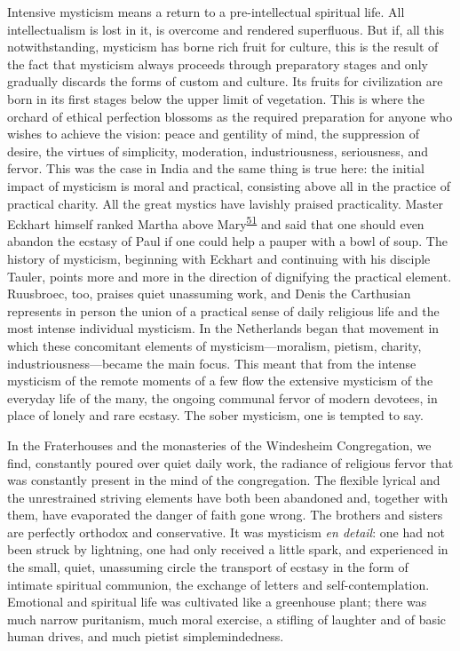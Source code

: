Intensive mysticism means a return to a pre-intellectual spiritual life.
All intellectualism is lost in it, is overcome and rendered superfluous.
But if, all this notwithstanding, mysticism has borne rich fruit for
culture, this is the result of the fact that mysticism always
\protect\hypertarget{17_Chapter_Ten__THE_FAILURE_OF_IMAG.xhtmlux5cux23page_265}{}{}proceeds
through preparatory stages and only gradually discards the forms of
custom and culture. Its fruits for civilization are born in its first
stages below the upper limit of vegetation. This is where the orchard of
ethical perfection blossoms as the required preparation for anyone who
wishes to achieve the vision: peace and gentility of mind, the
suppression of desire, the virtues of simplicity, moderation,
industriousness, seriousness, and fervor. This was the case in India and
the same thing is true here: the initial impact of mysticism is moral
and practical, consisting above all in the practice of practical
charity. All the great mystics have lavishly praised practicality.
Master Eckhart himself ranked Martha above
Mary\textsuperscript{\protect\hypertarget{17_Chapter_Ten__THE_FAILURE_OF_IMAG.xhtmlux5cux23id_635}{\protect\hyperlink{23_NOTES.xhtmlux5cux23id_636}{51}}}
and said that one should even abandon the ecstasy of Paul if one could
help a pauper with a bowl of soup. The history of mysticism, beginning
with Eckhart and continuing with his disciple Tauler, points more and
more in the direction of dignifying the practical element. Ruusbroec,
too, praises quiet unassuming work, and Denis the Carthusian represents
in person the union of a practical sense of daily religious life and the
most intense individual mysticism. In the Netherlands began that
movement in which these concomitant elements of mysticism---moralism,
pietism, charity, industriousness---became the main focus. This meant
that from the intense mysticism of the remote moments of a few flow the
extensive mysticism of the everyday life of the many, the ongoing
communal fervor of modern devotees, in place of lonely and rare ecstasy.
The sober mysticism, one is tempted to say.

In the Fraterhouses and the monasteries of the Windesheim Congregation,
we find, constantly poured over quiet daily work, the radiance of
religious fervor that was constantly present in the mind of the
congregation. The flexible lyrical and the unrestrained striving
elements have both been abandoned and, together with them, have
evaporated the danger of faith gone wrong. The brothers and sisters are
perfectly orthodox and conservative. It was mysticism \emph{en detail}:
one had not been struck by lightning, one had only received a little
spark, and experienced in the small, quiet, unassuming circle the
transport of ecstasy in the form of intimate spiritual communion, the
exchange of letters and self-contemplation. Emotional and spiritual life
was cultivated like a greenhouse plant; there was much narrow
puritanism, much moral exercise, a stifling of laughter and of basic
human drives, and much pietist simplemindedness.

